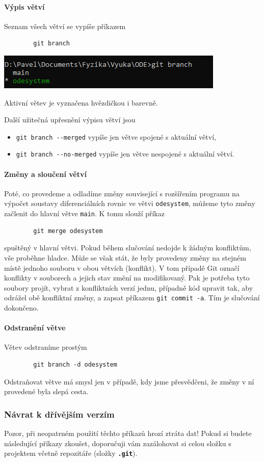\documentclass[a4paper,11pt,twoside]{article}
\newcommand{\subsubsubsection}[1]{\paragraph{#1}\mbox{}

}
\def\code#1{\textnormal{\texttt{#1}}}
\def\file#1{\textnormal{\textbf{\texttt{#1}}}}
\theoremstyle{red}
\theoremstyle{green}
\begin{document}
\subsubsubsection{Výpis větví}
    Seznam všech větví se vypíše příkazem
    \begin{lstlisting}
        git branch\end{lstlisting}
    \begin{center}\includegraphics[width=0.45\linewidth]{GitBranch.png}\end{center}
    Aktivní větev je vyznačena hvězdičkou i barevně.

    Další užitečná upřesnění výpisu větví jsou
    \begin{itemize}
        \item \code{git branch -{}-merged} vypíše jen větve spojené s aktuální větví,
        \item \code{git branch -{}-no-merged} vypíše jen větve nespojené s aktuální větví.
    \end{itemize}

\subsubsubsection{Změny a sloučení větví}
    Poté, co provedeme a odladíme změny související s rozšířením programu na výpočet soustavy diferenciálních rovnic ve větvi \code{odesystem}, můžeme tyto změny začlenit do hlavní větve \code{main}.
    K tomu slouží příkaz
    \begin{lstlisting}
        git merge odesystem\end{lstlisting}
    spuštěný v hlavní větvi.
    Pokud během slučování nedojde k žádným konfliktům, vše proběhne hladce.
    Může se však stát, že byly provedeny změny na stejném místě jednoho souboru v obou větvích (konflikt).
    V tom případě Git označí konflikty v souborech a jejich stav změní na modifikovaný.
    Pak je potřeba tyto soubory projít, vybrat z konfliktních verzí jednu, případně kód upravit tak, aby odrážel obě konfliktní změny, a zapsat příkazem \code{git commit -a}.
    Tím je slučování dokončeno.    
    
\subsubsubsection{Odstranění větve}
    Větev odstraníme prostým
    \begin{lstlisting}
        git branch -d odesystem\end{lstlisting}
    Odstraňovat větve má smysl jen v případě, kdy jsme přesvědčeni, že změny v ní provedené byla slepá cesta.

\subsubsection{Návrat k dřívějším verzím}
    Pozor, při neopatrném použití těchto příkazů hrozí ztráta dat!
    Pokud si budete následující příkazy zkoušet, doporučuji vám zazálohovat si celou složku s projektem včetně repozitáře (složky \file{.git}).
\end{document}
